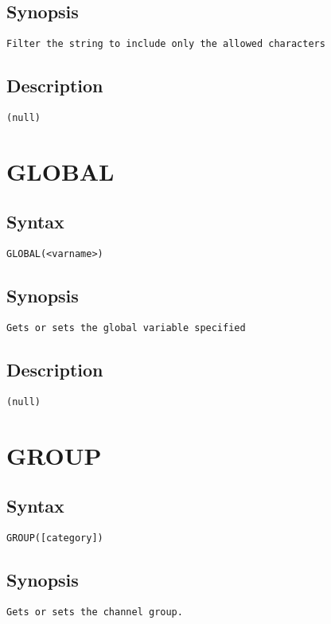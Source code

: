 \subsection{Synopsis}
\begin{verbatim}
Filter the string to include only the allowed characters
\end{verbatim}
\subsection{Description}
\begin{verbatim}
(null)
\end{verbatim}


\section{GLOBAL}
\subsection{Syntax}
\begin{verbatim}
GLOBAL(<varname>)
\end{verbatim}
\subsection{Synopsis}
\begin{verbatim}
Gets or sets the global variable specified
\end{verbatim}
\subsection{Description}
\begin{verbatim}
(null)
\end{verbatim}


\section{GROUP}
\subsection{Syntax}
\begin{verbatim}
GROUP([category])
\end{verbatim}
\subsection{Synopsis}
\begin{verbatim}
Gets or sets the channel group.
\end{verbatim}
